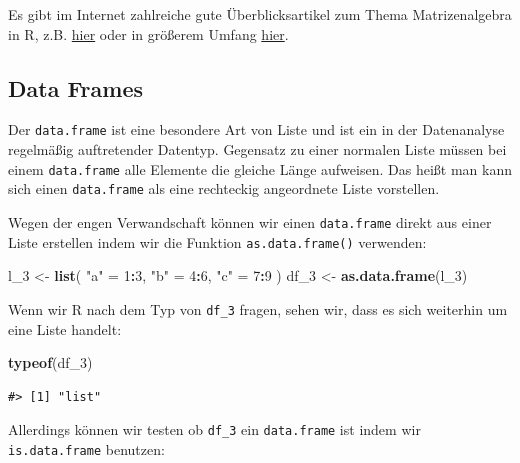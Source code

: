 \documentclass[]{book}
\newenvironment{Shaded}{\begin{snugshade}}{\end{snugshade}}
\newcommand{\KeywordTok}[1]{\textcolor[rgb]{0.13,0.29,0.53}{\textbf{#1}}}
\newcommand{\DecValTok}[1]{\textcolor[rgb]{0.00,0.00,0.81}{#1}}
\newcommand{\StringTok}[1]{\textcolor[rgb]{0.31,0.60,0.02}{#1}}
\newcommand{\OperatorTok}[1]{\textcolor[rgb]{0.81,0.36,0.00}{\textbf{#1}}}
\newcommand{\NormalTok}[1]{#1}
\begin{document}
Es gibt im Internet zahlreiche gute Überblicksartikel zum Thema
Matrizenalgebra in R, z.B.
\href{https://www.statmethods.net/advstats/matrix.html}{hier} oder in
größerem Umfang
\href{https://www.math.uh.edu/~jmorgan/Math6397/day13/LinearAlgebraR-Handout.pdf}{hier}.

\subsection{Data Frames}\label{data-frames}

Der \texttt{data.frame} ist eine besondere Art von Liste und ist ein in
der Datenanalyse regelmäßig auftretender Datentyp. Gegensatz zu einer
normalen Liste müssen bei einem \texttt{data.frame} alle Elemente die
gleiche Länge aufweisen. Das heißt man kann sich einen
\texttt{data.frame} als eine rechteckig angeordnete Liste vorstellen.

Wegen der engen Verwandschaft können wir einen \texttt{data.frame}
direkt aus einer Liste erstellen indem wir die Funktion
\texttt{as.data.frame()} verwenden:

\begin{Shaded}
\begin{Highlighting}[]
\NormalTok{l_}\DecValTok{3}\NormalTok{ <-}\StringTok{ }\KeywordTok{list}\NormalTok{(}
  \StringTok{"a"}\NormalTok{ =}\StringTok{ }\DecValTok{1}\OperatorTok{:}\DecValTok{3}\NormalTok{,}
  \StringTok{"b"}\NormalTok{ =}\StringTok{ }\DecValTok{4}\OperatorTok{:}\DecValTok{6}\NormalTok{,}
  \StringTok{"c"}\NormalTok{ =}\StringTok{ }\DecValTok{7}\OperatorTok{:}\DecValTok{9}
\NormalTok{)}
\NormalTok{df_}\DecValTok{3}\NormalTok{ <-}\StringTok{ }\KeywordTok{as.data.frame}\NormalTok{(l_}\DecValTok{3}\NormalTok{)}
\end{Highlighting}
\end{Shaded}

Wenn wir R nach dem Typ von \texttt{df\_3} fragen, sehen wir, dass es
sich weiterhin um eine Liste handelt:

\begin{Shaded}
\begin{Highlighting}[]
\KeywordTok{typeof}\NormalTok{(df_}\DecValTok{3}\NormalTok{)}
\end{Highlighting}
\end{Shaded}

\begin{verbatim}
#> [1] "list"
\end{verbatim}

Allerdings können wir testen ob \texttt{df\_3} ein \texttt{data.frame}
ist indem wir \texttt{is.data.frame} benutzen:
\end{document}
